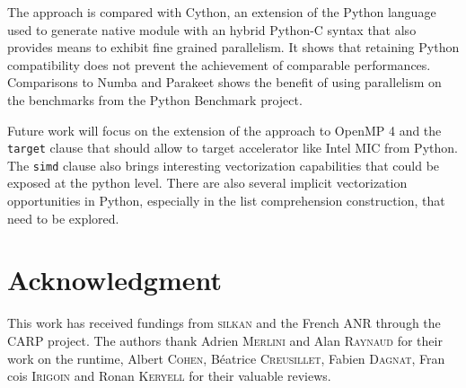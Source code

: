 \documentclass[conference]{IEEEtran}
\begin{document}
The approach is compared with Cython, an extension of the Python language used
to generate native module with an hybrid Python-C syntax that also provides
means to exhibit fine grained parallelism. It shows that retaining Python
compatibility does not prevent the achievement of comparable performances.
Comparisons to Numba and Parakeet shows the benefit of using parallelism on the
benchmarks from the Python Benchmark project.

Future work will focus on the extension of the approach to OpenMP 4 and the
\texttt{target} clause that should allow to target accelerator like Intel MIC
from Python.
The \texttt{simd} clause also brings interesting vectorization capabilities that
could be exposed at the python level. There are also several implicit
vectorization opportunities in Python, especially in the list comprehension
construction, that need to be explored.

\section*{Acknowledgment}

This work has received fundings from \textsc{silkan} and the French ANR through
the CARP project. The authors thank Adrien \textsc{Merlini} and Alan
\textsc{Raynaud} for their work on the runtime, Albert \textsc{Cohen},
B{\'e}atrice \textsc{Creusillet}, Fabien \textsc{Dagnat}, Fran{\,c}ois
\textsc{Irigoin} and Ronan \textsc{Keryell} for their valuable reviews.



\end{document}
